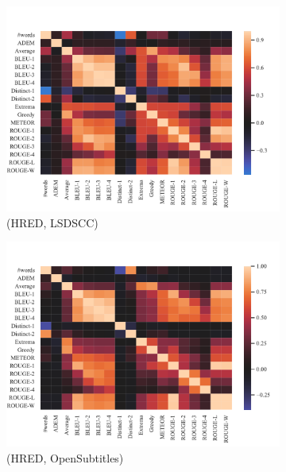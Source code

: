 \begin{figure}[htbp]
    \centering
    \begin{subfigure}{0.40\linewidth}
        \centering
        \includegraphics[width=\linewidth]{figure/plot/heatmap/v2/pearson/hred/lsdscc/plot.pdf}
        \caption{(HRED, LSDSCC)}
    \end{subfigure}%
    \begin{subfigure}{0.40\linewidth}
        \centering
        \includegraphics[width=\linewidth]{figure/plot/heatmap/v2/pearson/hred/opensub/plot.pdf}
        \caption{(HRED, OpenSubtitles)}
    \end{subfigure}%
    \begin{subfigure}{0.40\linewidth}

\end{subfigure}
\end{figure}
